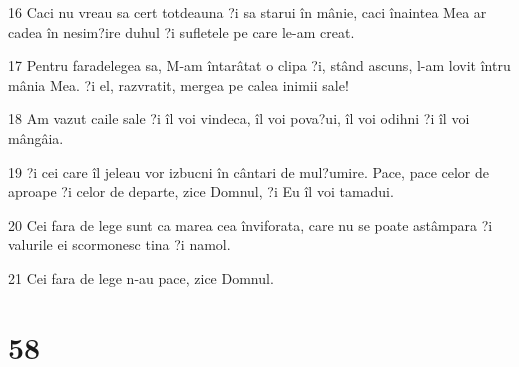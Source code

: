 \par 16 Caci nu vreau sa cert totdeauna ?i sa starui în mânie, caci înaintea Mea ar cadea în nesim?ire duhul ?i sufletele pe care le-am creat.
\par 17 Pentru faradelegea sa, M-am întarâtat o clipa ?i, stând ascuns, l-am lovit întru mânia Mea. ?i el, razvratit, mergea pe calea inimii sale!
\par 18 Am vazut caile sale ?i îl voi vindeca, îl voi pova?ui, îl voi odihni ?i îl voi mângâia.
\par 19 ?i cei care îl jeleau vor izbucni în cântari de mul?umire. Pace, pace celor de aproape ?i celor de departe, zice Domnul, ?i Eu îl voi tamadui.
\par 20 Cei fara de lege sunt ca marea cea înviforata, care nu se poate astâmpara ?i valurile ei scormonesc tina ?i namol.
\par 21 Cei fara de lege n-au pace, zice Domnul.

\chapter{58}

